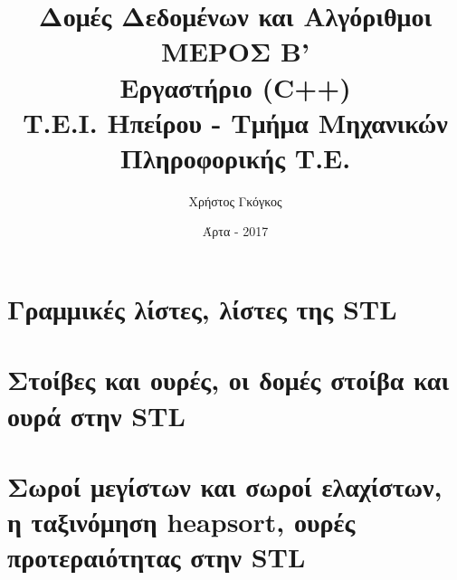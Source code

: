 \documentclass[11pt,a4paper]{book}
\title{Δομές Δεδομένων και Αλγόριθμοι \\ ΜΕΡΟΣ B' \\ Εργαστήριο (C++)\\ Τ.Ε.Ι. Ηπείρου - Τμήμα Μηχανικών Πληροφορικής Τ.Ε.}
\author{Χρήστος Γκόγκος }
\date{Άρτα - 2017}
\begin{document}
\maketitle
\mainmatter

\setcounter{chapter}{3} 
\chapter{Γραμμικές λίστες, λίστες της STL}


\chapter{Στοίβες και ουρές, οι δομές στοίβα και ουρά στην STL}


\chapter{Σωροί μεγίστων και σωροί ελαχίστων, η ταξινόμηση heapsort, ουρές προτεραιότητας στην STL}

\end{document}
